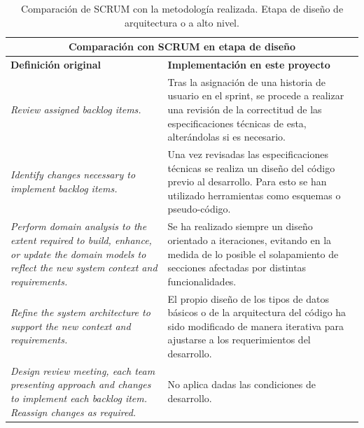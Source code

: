 \begin{table}[]
    \centering
    \begin{tabular}{p{5cm} p{6cm}}
        \multicolumn{2}{c}{\textbf{Comparación con SCRUM en etapa de diseño}} \\
        \hline 
        \textbf{Definición original} & \textbf{Implementación en este proyecto} \\ \hline \hline
        
        \textit{Review assigned backlog items.} & Tras la asignación de una historia de usuario en el sprint, se procede a realizar una revisión de la correctitud de las especificaciones técnicas de esta, alterándolas si es necesario. \\ \hline
        
        \textit{Identify changes necessary to implement backlog items.} & Una vez revisadas las especificaciones técnicas se realiza un diseño del código previo al desarrollo. Para esto se han utilizado herramientas como esquemas o pseudo-código. \\ \hline
        
        \textit{Perform domain analysis to the extent required to build, enhance, or update the domain models to reflect the new system context and requirements.} & Se ha realizado siempre un diseño orientado a iteraciones, evitando en la medida de lo posible el solapamiento de secciones afectadas por distintas funcionalidades. \\ \hline
        
        \textit{Refine the system architecture to support the new context and requirements.} & El propio diseño de los tipos de datos básicos o de la arquitectura del código ha sido modificado de manera iterativa para ajustarse a los requerimientos del desarrollo. \\ \hline
        
        \textit{Design review meeting, each team presenting approach and changes to implement each backlog item. Reassign changes as required.} & No aplica dadas las condiciones de desarrollo. \\ 
    \end{tabular}                   
    \caption{Comparación de SCRUM con la metodología realizada. Etapa de diseño de arquitectura o a alto nivel.}
    \label{tab:met_diseño}
\end{table}


